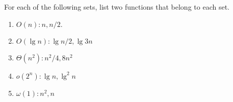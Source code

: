 \documentclass[12pt]{article}
\newenvironment{problem}[2][Problem]{\begin{trivlist}
\item[\hskip \labelsep {\bfseries #1}\hskip \labelsep {\bfseries #2.}]}{\end{trivlist}}
\begin{document}
\begin{problem}{7} 
For each of the following sets, list two functions that belong to each set.
\begin{enumerate}
\item $O(n): n, n/2.$

\item $O(\lg n): \lg n/2, \lg 3n$

\item $\Theta(n^2): n^2/4, 8n^2$

\item $o(2^n): \lg n, \lg^2 n$

\item $\omega(1): n^2, n$
\end{enumerate}
\end{problem}
\end{document}
